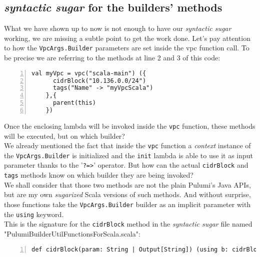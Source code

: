 \subsection{\textit{syntactic sugar} for the builders' methods}
\label{ssec:syn-sug-builders}
What we have shown up to now is not enough to have our \textit{syntactic sugar} working, we are missing a subtle point to get the work done.
Let's pay attention to how the \texttt{VpcArgs.Builder} parameters are set inside the vpc function call.
To be precise we are referring to the methods at line 2 and 3 of this code:\\
\begin{minipage}{\linewidth}
  \begin{lstlisting}[numbers=left, numberstyle=\tiny, numbersep=-5pt, stepnumber=1]
    val myVpc = vpc("scala-main") ({
      cidrBlock("10.136.0.0/24")
      tags("Name" -> "myVpcScala")
    },{
      parent(this)
    })
  \end{lstlisting}
\end{minipage}
Once the enclosing lambda will be invoked inside the \texttt{vpc} function, these methods will be executed, but on which builder?\\
We already mentioned the fact that inside the \texttt{vpc} function a \textit{context} instance of the \texttt{VpcArgs.Builder} is initialized and the \texttt{init} lambda is able to use it as input parameter thanks to the '\texttt{?=>}' operator.
But how can the actual \texttt{cidrBlock} and \texttt{tags} methods know on which builder they are being invoked?\\
We shall consider that those two methods are not the plain Pulumi's Java APIs, but are my own \textit{sugarized} Scala versions of such methods. 
And without surprise, those functions take the \texttt{VpcArgs.Builder} builder as an implicit parameter with the \texttt{using} keyword.\\
This is the signature for the \texttt{cidrBlock} method in the \textit{syntactic sugar} file named "PulumiBuilderUtilFunctionsForScala.scala":\\
\begin{minipage}{\linewidth}
\begin{lstlisting}[numbers=left, numberstyle=\tiny, numbersep=-5pt, stepnumber=1, linewidth=420pt]
  def cidrBlock(param: String | Output[String]) (using b: cidrBlockOwners): Unit
\end{lstlisting}
\end{minipage}
